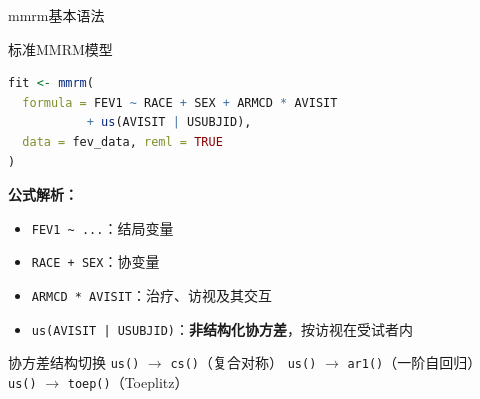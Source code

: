 \documentclass[aspectratio=169,11pt]{beamer}
\begin{document}
\begin{frame}[fragile]{mmrm基本语法}
\begin{block}{标准MMRM模型}
\begin{lstlisting}[language=R,basicstyle=\ttfamily\scriptsize]
fit <- mmrm(
  formula = FEV1 ~ RACE + SEX + ARMCD * AVISIT 
           + us(AVISIT | USUBJID),
  data = fev_data, reml = TRUE
)
\end{lstlisting}
\end{block}

\textbf{公式解析：}
\begin{itemize}
    \item \texttt{FEV1 \textasciitilde\ ...}：结局变量
    \item \texttt{RACE + SEX}：协变量
    \item \texttt{ARMCD * AVISIT}：治疗、访视及其交互
    \item \texttt{us(AVISIT | USUBJID)}：\textbf{非结构化协方差}，按访视在受试者内
\end{itemize}

\vspace{0.1cm}
\begin{exampleblock}{协方差结构切换}
\texttt{us()} $\rightarrow$ \texttt{cs()}（复合对称）\quad
\texttt{us()} $\rightarrow$ \texttt{ar1()}（一阶自回归）\quad
\texttt{us()} $\rightarrow$ \texttt{toep()}（Toeplitz）
\end{exampleblock}
\end{frame}
\end{document}

